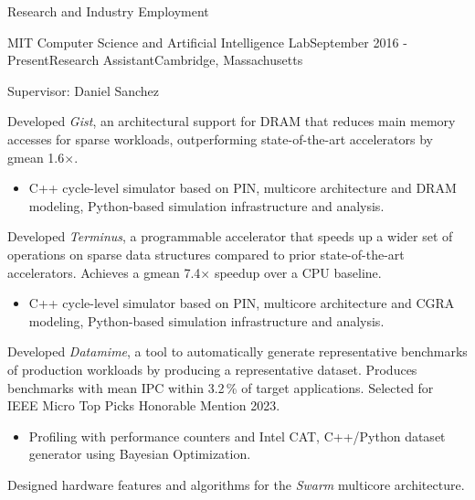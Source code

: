 \documentclass{resume} %
\begin{document}
\begin{rSection}{Research and Industry Employment}

\begin{rSubsection}{MIT Computer Science and Artificial Intelligence Lab}{September 2016 - Present}{Research Assistant}{Cambridge, Massachusetts}

\item Supervisor: Daniel Sanchez
\item Developed {\it Gist}, an architectural support for DRAM that reduces main memory accesses for sparse workloads,
    outperforming state-of-the-art accelerators by gmean 1.6$\times$.
    \vspace{-0.2cm}
    {\small
    \begin{itemize}
    \item C++ cycle-level simulator based on PIN, multicore architecture and DRAM modeling, Python-based simulation infrastructure and analysis.
    \end{itemize}
    }
    \vspace{0.2cm}
\item Developed {\it Terminus}, a programmable accelerator that speeds up a wider set of operations on sparse data structures
    compared to prior state-of-the-art accelerators. Achieves a gmean 7.4$\times$ speedup over a CPU baseline.
    \vspace{-0.2cm}
    {\small
    \begin{itemize}
    \item C++ cycle-level simulator based on PIN, multicore architecture and CGRA modeling, Python-based simulation infrastructure and analysis.
    \end{itemize}
    }
    \vspace{0.2cm}
\item Developed {\it Datamime}, a tool to automatically generate representative benchmarks of production workloads
    by producing a representative dataset. Produces benchmarks with mean IPC within 3.2\,\% of target applications.
    Selected for IEEE Micro Top Picks Honorable Mention 2023.
    \vspace{-0.2cm}
    {\small
    \begin{itemize}
        \item Profiling with performance counters and Intel CAT, C++/Python dataset generator using Bayesian Optimization.
    \end{itemize}
}
    \vspace{0.2cm}
\item Designed hardware features and algorithms for the {\it Swarm} multicore architecture.
\end{rSubsection}


\end{rSection}
\end{document}
